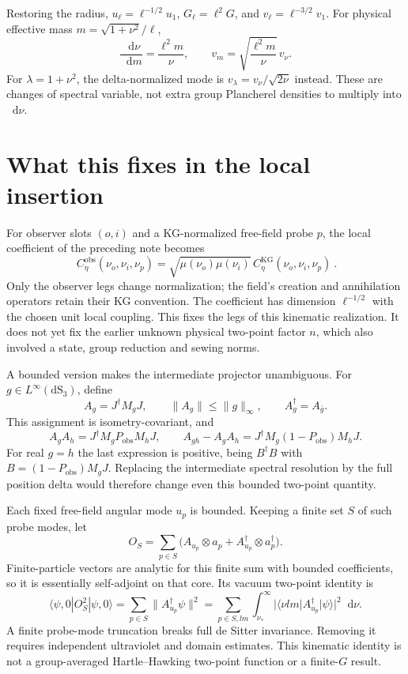 \documentclass[11pt,a4paper]{article}
\newcommand{\dd}{\mathop{}\!\mathrm d}
\begin{document}
Restoring the radius, $u_\ell=\ell^{-1/2}u_1$,
$G_\ell=\ell^2G$, and $v_\ell=\ell^{-3/2}v_1$.
For physical effective mass $m=\sqrt{1+\nu^2}/\ell$,
\begin{equation}
 \frac{\dd\nu}{\dd m}=\frac{\ell^2m}{\nu},\qquad
 v_m=\sqrt{\frac{\ell^2m}{\nu}}\,v_\nu .
\end{equation}
For $\lambda=1+\nu^2$, the delta-normalized mode is
$v_\lambda=v_\nu/\sqrt{2\nu}$ instead.
These are changes of spectral variable, not extra group Plancherel
densities to multiply into $\dd\nu$.

\section{What this fixes in the local insertion}
For observer slots $(o,i)$ and a KG-normalized free-field probe $p$, the
local coefficient of the preceding note becomes
\begin{equation}
 \boxed{\ C_\eta^{\mathrm{obs}}(\nu_o,\nu_i,\nu_p)
 =\sqrt{\mu(\nu_o)\mu(\nu_i)}\,C_\eta^{\mathrm{KG}}(\nu_o,\nu_i,\nu_p)\ } .
\end{equation}
Only the observer legs change normalization; the field's creation and
annihilation operators retain their KG convention.
The coefficient has dimension $\ell^{-1/2}$ with the chosen unit local
coupling. This fixes the legs of this kinematic realization. It does
not yet fix the earlier unknown physical two-point factor $n$, which
also involved a state, group reduction and sewing norms.

A bounded version makes the intermediate projector unambiguous.
For $g\in L^\infty(\mathrm{dS}_3)$, define
\begin{equation}
 A_g=J^\dagger M_gJ,\qquad \|A_g\|\leq\|g\|_\infty,\qquad
 A_g^\dagger=A_{\bar g}.
\end{equation}
This assignment is isometry-covariant, and
\begin{equation}
 A_gA_h=J^\dagger M_gP_{\mathrm{obs}}M_hJ,\qquad
 A_{gh}-A_gA_h=J^\dagger M_g(1-P_{\mathrm{obs}})M_hJ.
 \label{eq:leakage}
\end{equation}
For real $g=h$ the last expression is positive, being $B^\dagger B$
with $B=(1-P_{\mathrm{obs}})M_gJ$.
Replacing the intermediate spectral resolution by the full position
delta would therefore change even this bounded two-point quantity.

Each fixed free-field angular mode $u_p$ is bounded. Keeping a finite
set $S$ of such probe modes, let
\[
 O_S=\sum_{p\in S}\big(A_{u_p}\otimes a_p+
                         A_{u_p}^\dagger\otimes a_p^\dagger\big).
\]
Finite-particle vectors are analytic for this finite sum with bounded
coefficients, so it is essentially self-adjoint on that core.
Its vacuum two-point identity is
\begin{equation}
 \langle\psi,0|O_S^2|\psi,0\rangle
 =\sum_{p\in S}\|A_{u_p}^\dagger\psi\|^2
 =\sum_{p\in S,lm}\int_{\nu_*}^\infty
 |\langle\nu lm|A_{u_p}^\dagger|\psi\rangle|^2\dd\nu .
\end{equation}
A finite probe-mode truncation breaks full de Sitter invariance.
Removing it requires independent ultraviolet and domain estimates.
This kinematic identity is not a group-averaged Hartle--Hawking
two-point function or a finite-$G$ result.
\end{document}
